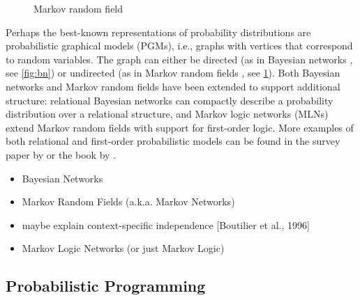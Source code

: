 \begin{figure}
  \centering
  \caption{Markov random field}
  \label{fig:mrf}
\end{figure}

\citep{DBLP:series/synthesis/2019Dechter}

Perhaps the best-known representations of probability distributions are
probabilistic graphical models (PGMs), i.e., graphs with vertices that
correspond to random variables. The graph can either be directed (as in Bayesian
networks \citep{DBLP:books/daglib/0066829}, see \cref{fig:bn}) or undirected (as
in Markov random fields \citep{spitzer1971markov}, see \cref{fig:mrf}). Both
Bayesian networks and Markov random fields have been extended to support
additional structure: relational Bayesian networks \citep{DBLP:conf/uai/Jaeger97}
can compactly describe a probability distribution over a relational structure,
and Markov logic networks (MLNs) \citep{DBLP:journals/ml/RichardsonD06} extend
Markov random fields with support for first-order logic. More examples of both
relational and first-order probabilistic models can be found in the survey paper
by \citet{DBLP:series/sci/BrazAR08} or the book by \citet{DBLP:series/synthesis/2016Raedt}.

\begin{itemize}
\item Bayesian Networks \citep{DBLP:books/daglib/0066829}
\item Markov Random Fields (a.k.a. Markov Networks)
\item maybe explain context-specific independence [Boutilier et al., 1996]
\item Markov Logic Networks (or just Markov Logic) \citep{DBLP:journals/ml/RichardsonD06}
\end{itemize}

\subsection{Probabilistic Programming}

